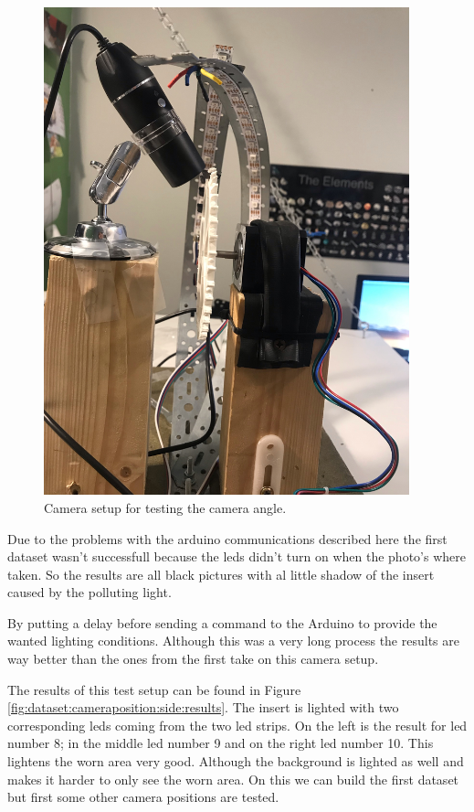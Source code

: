 \begin{figure}[hbtp]
\includegraphics[width=4.166667in, keepaspectratio=true,angle=270]{./fig/Vision/Dataset/automated_datasets/1_check_camera_position/1_camera_position_side/achter2.jpeg}
\caption{Camera setup for testing the camera angle.}
\label{fig:dataset:cameraposition:side}
\end{figure}

Due to the problems with the arduino communications described here the first dataset wasn't successfull because the leds didn't turn on when the photo's where taken. So the results are all black pictures with al little shadow of the insert caused by the polluting light. 

By putting a delay before sending a command to the Arduino to provide the wanted lighting conditions. Although this was a very long process the results are way better than the ones from the first take on this camera setup. 

The results of this test setup can be found in Figure \ref{fig:dataset:cameraposition:side:results}. The insert is lighted with two corresponding leds coming from the two led strips. On the left is the result for led number 8; in the middle led number 9 and on the right led number 10. This lightens the worn area very good. Although the background is lighted as well and makes it harder to only see the worn area. On this we can build the first dataset but first some other camera positions are tested.

